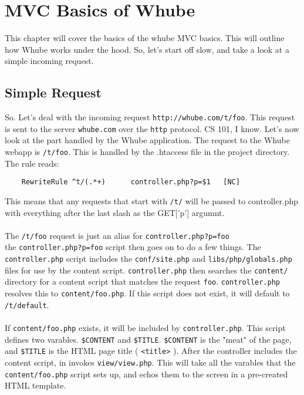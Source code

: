 \chapter {MVC Basics of Whube}
This chapter will cover the basics of the whube MVC
basics. This will outline how Whube works under the hood.
So, let's start off slow, and take a look at a simple incoming
request.
\section {Simple Request}
So. Let's deal with the incoming request \texttt{http://whube.com/t/foo}.
This request is sent to the server \texttt{whube.com} over the \texttt{http}
protocol. CS 101, I know. Let's now look at the part handled by the Whube
application. The request to the Whube webapp is \texttt{/t/foo}. This is handled
by the .htaccess file in the project directory. The rule reads:
\begin{verbatim}
    RewriteRule ^t/(.*+)      controller.php?p=$1   [NC]
\end{verbatim}
This means that any requests that start with \texttt{/t/} will be passed to controller.php
with everything after the last slash as the GET['p'] argumnt. \\
\\
The \texttt{/t/foo} request is just an alias for \texttt{controller.php?p=foo}
\\
the \texttt{controller.php?p=foo} script then goes on to do a few things. The \texttt{controller.php}
script includes the \texttt{conf/site.php} and \texttt{libs/php/globals.php} files for use by the 
content script. \texttt{controller.php} then searches the \texttt{content/} directory for a content
script that matches the request \texttt{foo}. \texttt{controller.php} resolves this to \texttt{content/foo.php}.
If this script does not exist, it will default to \texttt{/t/default}.
\\
\\
If \texttt{content/foo.php} exists, it will be included by \texttt{controller.php}.
This script defines two varables. \texttt{\$CONTENT} and \texttt{\$TITLE}.
\texttt{\$CONTENT} is the "meat" of the page, and \texttt{\$TITLE} is the HTML
page title ( \texttt{<title>} ).
After the controller includes the content script, in invokes \texttt{view/view.php}.
This will take all the varables that the \texttt{content/foo.php} script sets up, and
echos them to the screen in a pre-created HTML template.

